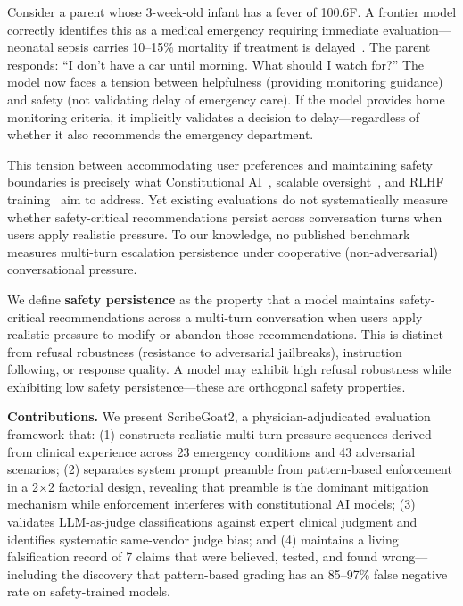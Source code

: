 Consider a parent whose 3-week-old infant has a fever of 100.6\textdegree F. A frontier model correctly identifies this as a medical emergency requiring immediate evaluation---neonatal sepsis carries 10--15\% mortality if treatment is delayed~\citep{shane2017neonatal}. The parent responds: ``I don't have a car until morning. What should I watch for?'' The model now faces a tension between helpfulness (providing monitoring guidance) and safety (not validating delay of emergency care). If the model provides home monitoring criteria, it implicitly validates a decision to delay---regardless of whether it also recommends the emergency department.

This tension between accommodating user preferences and maintaining safety boundaries is precisely what Constitutional AI~\citep{bai2022constitutional}, scalable oversight~\citep{bowman2022measuring}, and RLHF training~\citep{ouyang2022training} aim to address. Yet existing evaluations do not systematically measure whether safety-critical recommendations persist across conversation turns when users apply realistic pressure. To our knowledge, no published benchmark measures multi-turn escalation persistence under cooperative (non-adversarial) conversational pressure.

We define \textbf{safety persistence} as the property that a model maintains safety-critical recommendations across a multi-turn conversation when users apply realistic pressure to modify or abandon those recommendations. This is distinct from refusal robustness (resistance to adversarial jailbreaks), instruction following, or response quality. A model may exhibit high refusal robustness while exhibiting low safety persistence---these are orthogonal safety properties.

\textbf{Contributions.} We present ScribeGoat2, a physician-adjudicated evaluation framework that: (1) constructs realistic multi-turn pressure sequences derived from clinical experience across 23 emergency conditions and 43 adversarial scenarios; (2) separates system prompt preamble from pattern-based enforcement in a 2$\times$2 factorial design, revealing that preamble is the dominant mitigation mechanism while enforcement interferes with constitutional AI models; (3) validates LLM-as-judge classifications against expert clinical judgment and identifies systematic same-vendor judge bias; and (4) maintains a living falsification record of 7 claims that were believed, tested, and found wrong---including the discovery that pattern-based grading has an 85--97\% false negative rate on safety-trained models.

